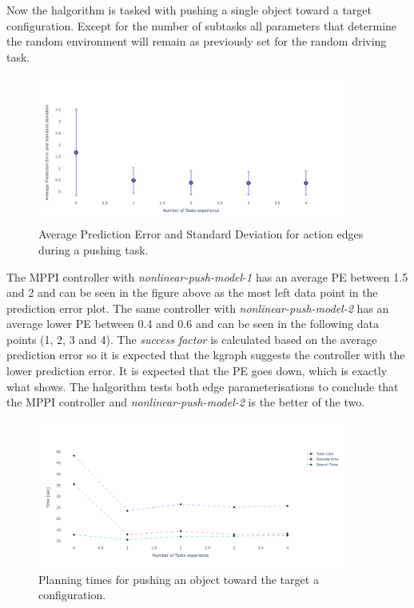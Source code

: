 Now the \ac{halgorithm} is tasked with pushing a single object toward a target configuration. Except for the number of subtasks all parameters that determine the random environment will remain as previously set for the random driving task.\bs

\begin{figure}[H]
    \centering
    \includegraphics[width=0.9\textwidth]{figures/results/rand_push_pred_error}
    \caption{Average Prediction Error and Standard Deviation for action edges during a pushing task.}%
    \label{fig:rand_push_full_pred}
\end{figure}

The \ac{MPPI} controller with \textit{nonlinear-push-model-1} has an average \ac{PE} between 1.5 and 2 and can be seen in the figure above as the most left data point in the prediction error plot. The same controller with \textit{nonlinear-push-model-2} has an average lower \ac{PE} between 0.4 and 0.6 and can be seen in the following data points (1, 2, 3 and 4). The \textit{success factor} is calculated based on the average prediction error so it is expected that the \ac{kgraph} suggests the controller with the lower prediction error. It is expected that the \ac{PE} goes down, which is exactly what  shows. The \ac{halgorithm} tests both edge parameterisations to conclude that the \ac{MPPI} controller and \textit{nonlinear-push-model-2} is the better of the two.  

\begin{figure}[H]
    \centering
    \includegraphics[width=0.9\textwidth]{figures/results/random_push_execution_times}
    \caption{Planning times for pushing an object toward the target a configuration.}%
    \label{fig:random_push_all_times}
\end{figure}

